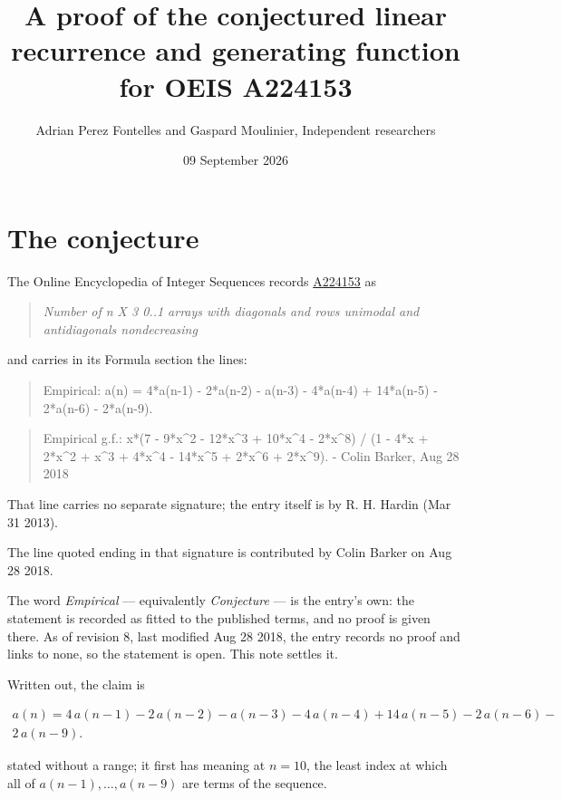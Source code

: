 \documentclass[11pt]{article}
\title{A proof of the conjectured linear recurrence and generating function for OEIS A224153}
\author{Adrian Perez Fontelles and Gaspard Moulinier, Independent researchers}
\date{09 September 2026}
\theoremstyle{definition}
\begin{document}
\maketitle
\section{The conjecture}

The Online Encyclopedia of Integer Sequences records \href{https://oeis.org/A224153}{A224153} as

\begin{quote}\itshape Number of n X 3 0..1 arrays with diagonals and rows unimodal and antidiagonals nondecreasing\end{quote}

and carries in its Formula section the lines:

\begin{quote}\ttfamily Empirical: a(n) = 4*a(n-1) - 2*a(n-2) - a(n-3) - 4*a(n-4) + 14*a(n-5) - 2*a(n-6) - 2*a(n-9).\end{quote}

\begin{quote}\ttfamily Empirical g.f.: x*(7 - 9*x\textasciicircum{}2 - 12*x\textasciicircum{}3 + 10*x\textasciicircum{}4 - 2*x\textasciicircum{}8) / (1 - 4*x + 2*x\textasciicircum{}2 + x\textasciicircum{}3 + 4*x\textasciicircum{}4 - 14*x\textasciicircum{}5 + 2*x\textasciicircum{}6 + 2*x\textasciicircum{}9). - Colin Barker, Aug 28 2018\end{quote}

That line carries no separate signature; the entry itself is by R. H. Hardin (Mar 31 2013).

The line quoted ending in that signature is contributed by Colin Barker on Aug 28 2018.

The word {\itshape Empirical} --- equivalently {\itshape Conjecture} --- is the entry's own: the statement is recorded as fitted to the published terms, and no proof is given there. As of revision 8, last modified Aug 28 2018, the entry records no proof and links to none, so the statement is open. This note settles it.

Written out, the claim is

\begin{multline*} a(n) = 4\,a(n-1) - 2\,a(n-2) - a(n-3) - 4\,a(n-4) + 14\,a(n-5) - 2\,a(n-6) - \\ 2\,a(n-9). \end{multline*}

stated without a range; it first has meaning at $n = 10$, the least index at which all of $a(n-1),\dots,a(n-9)$ are terms of the sequence.
\end{document}
